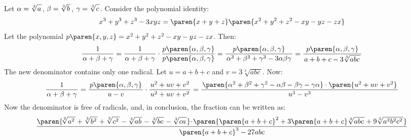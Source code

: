Let
$\alpha = \sqrt[3]{a \vphantom{b c} \mspace{2mu}}$,
$ \beta = \sqrt[3]{b \vphantom{c a} \mspace{2mu}}$,
$\gamma = \sqrt[3]{c \vphantom{a b} \mspace{2mu}}$.
Consider the polynomial identity:
\begin{equation*}
  x^3 + y^3 + z^3 - 3 x y z = \paren{x + y + z} \paren{x^2 + y^2 + z^2 - x y - y z - z x}
\end{equation*}
Let the polynomial $p\paren{x, y, z} = x^2 + y^2 + z^2 - x y - y z - z x$.
Then:
\begin{equation*}
  \frac{1}{\mspace{1mu} \alpha + \beta + \gamma \mspace{1mu}}
  = \frac{1}{\mspace{1mu} \alpha + \beta + \gamma \mspace{1mu}}
    \cdot \frac{p\paren{\alpha, \beta, \gamma}}
               {p\paren{\alpha, \beta, \gamma}}
  = \frac{p\paren{\alpha, \beta, \gamma}}
         {\mspace{2mu} \alpha^3 + \beta^3 + \gamma^3 - 3 \alpha \beta \gamma \mspace{2mu}}
  = \frac{p\paren{\alpha, \beta, \gamma}}
         {\mspace{2mu} a + b + c - 3 \sqrt[3]{a b c \mspace{2mu}} \mspace{2mu}}
\end{equation*}
The new denominator contains only one radical.
Let $u = a + b + c$ and $v = 3 \sqrt[3]{a b c \mspace{2mu}}$. Now:
\begin{equation*}
  \frac{1}{\mspace{2mu} \alpha + \beta + \gamma \mspace{2mu}}
  = \frac{\mspace{2mu} p\paren{\alpha, \beta, \gamma} \mspace{2mu}}
         {\mspace{2mu} u - v \mspace{2mu}}
    \cdot
    \frac{\mspace{2mu} u^2 + u v + v^2 \mspace{2mu}}
         {\mspace{2mu} u^2 + u v + v^2 \mspace{2mu}}
  = \frac{\mspace{2mu} \paren{\alpha^2 + \beta^2 + \gamma^2 - \alpha \beta - \beta \gamma - \gamma \alpha}
          \cdot \paren{u^2 + u v + v^2} \mspace{2mu}}
         {\mspace{2mu} u^3 - v^3 \mspace{2mu}}
\end{equation*}
Now the denominator is free of radicals,
and, in conclusion, the fraction can be written as:
\begin{equation*}
  \frac{\paren{ \!
          \sqrt[3]{a^2 \vphantom{b^2 c^2} \mspace{2mu}}
          + \sqrt[3]{b^2 \vphantom{a^2 c^2} \mspace{2mu}}
          + \sqrt[3]{c^2 \vphantom{a^2 b^2} \mspace{2mu}}
          - \sqrt[3]{a b \vphantom{c} \mspace{2mu}}
          - \sqrt[3]{b c \vphantom{a} \mspace{2mu}}
          - \sqrt[3]{c a \vphantom{b} \mspace{2mu}}
        } \! \cdot \!
        \paren{
          \paren{a + b + c}^2
          + 3 \paren{a + b + c} \sqrt[3]{a b c \mspace{2mu}}
          + 9 \sqrt[3]{a^2 b^2 c^2 \mspace{2mu}}
        }}
       {\mspace{1mu} \paren{a + b + c}^3 - 27 a b c \mspace{1mu}}
\end{equation*}
